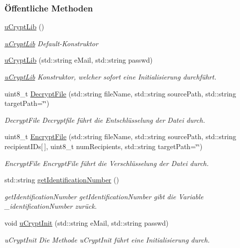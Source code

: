 \subsubsection*{Öffentliche Methoden}
\begin{DoxyCompactItemize}
\item 
\hypertarget{classuCrypt_1_1uCryptLib_aab8ae866a5f5bb7728b76a217f7cabf0}{}\hyperlink{classuCrypt_1_1uCryptLib_aab8ae866a5f5bb7728b76a217f7cabf0}{u\+Crypt\+Lib} ()\label{classuCrypt_1_1uCryptLib_aab8ae866a5f5bb7728b76a217f7cabf0}

\begin{DoxyCompactList}\small\item\em \hyperlink{classuCrypt_1_1uCryptLib}{u\+Crypt\+Lib} Default-\/\+Konstruktor \end{DoxyCompactList}\item 
\hyperlink{classuCrypt_1_1uCryptLib_a87345999d9b68b3e116e091f5d5b1e80}{u\+Crypt\+Lib} (std\+::string e\+Mail, std\+::string passwd)
\begin{DoxyCompactList}\small\item\em \hyperlink{classuCrypt_1_1uCryptLib}{u\+Crypt\+Lib} Konstruktor, welcher sofort eine Initialisierung durchführt. \end{DoxyCompactList}\item 
uint8\+\_\+t \hyperlink{classuCrypt_1_1uCryptLib_a868127bd1d2aa4edd62076663d801b66}{Decrypt\+File} (std\+::string file\+Name, std\+::string source\+Path, std\+::string target\+Path=\char`\"{}\char`\"{})
\begin{DoxyCompactList}\small\item\em Decrypt\+File Decryptfile führt die Entschlüsselung der Datei durch. \end{DoxyCompactList}\item 
uint8\+\_\+t \hyperlink{classuCrypt_1_1uCryptLib_a2a5e702b03339e4d1f15b8fbbf67e635}{Encrypt\+File} (std\+::string file\+Name, std\+::string source\+Path, std\+::string recipient\+I\+Ds\mbox{[}$\,$\mbox{]}, uint8\+\_\+t num\+Recipients, std\+::string target\+Path=\char`\"{}\char`\"{})
\begin{DoxyCompactList}\small\item\em Encrypt\+File Encrypt\+File führt die Verschlüsselung der Datei durch. \end{DoxyCompactList}\item 
std\+::string \hyperlink{classuCrypt_1_1uCryptLib_a6a659692c488ec460fa123ad81fa46f1}{get\+Identification\+Number} ()
\begin{DoxyCompactList}\small\item\em get\+Identification\+Number get\+Identification\+Number gibt die Variable \+\_\+identification\+Number zurück. \end{DoxyCompactList}\item 
void \hyperlink{classuCrypt_1_1uCryptLib_a6d7c6328bb218876de708d43be91494d}{u\+Crypt\+Init} (std\+::string e\+Mail, std\+::string passwd)
\begin{DoxyCompactList}\small\item\em u\+Crypt\+Init Die Methode u\+Crypt\+Init führt eine Initialisierung durch. \end{DoxyCompactList}\end{DoxyCompactItemize}
